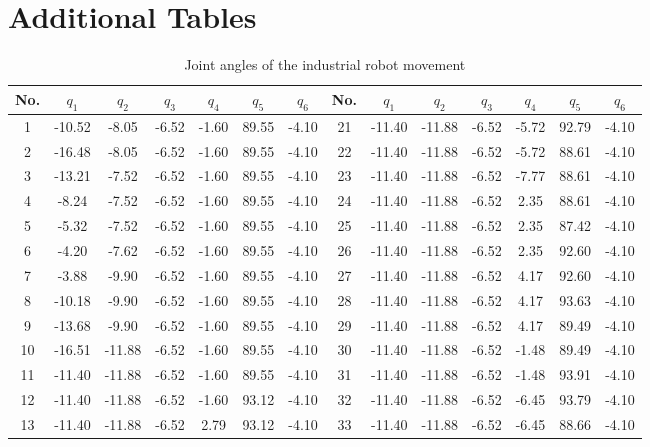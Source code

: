 \documentclass[lettersize,onecolumn]{IEEEtran}
\begin{document}
\section{Additional Tables}
\renewcommand{\thetable}{S.I}
\begin{table}[!htb]
	\caption{Joint angles of the industrial robot movement}
	\label{tab1}
	\centering
	\footnotesize
	\begin{tabular}{c cccccc|c cccccc}
		\toprule
		No. & \(q_1\) & \(q_2\) & \(q_3\) & \(q_4\) & \(q_5\) & \(q_6\) & No. & \(q_1\) & \(q_2\) & \(q_3\) & \(q_4\) & \(q_5\) & \(q_6\) \\
		\midrule
		1  & -10.52 & -8.05 & -6.52 & -1.60 & 89.55 & -4.10 & 21 & -11.40 & -11.88 & -6.52 & -5.72 & 92.79 & -4.10 \\
		2  & -16.48 & -8.05 & -6.52 & -1.60 & 89.55 & -4.10 & 22 & -11.40 & -11.88 & -6.52 & -5.72 & 88.61 & -4.10 \\
		3  & -13.21 & -7.52 & -6.52 & -1.60 & 89.55 & -4.10 & 23 & -11.40 & -11.88 & -6.52 & -7.77 & 88.61 & -4.10 \\
		4  & -8.24  & -7.52 & -6.52 & -1.60 & 89.55 & -4.10 & 24 & -11.40 & -11.88 & -6.52 & 2.35  & 88.61 & -4.10 \\
		5  & -5.32  & -7.52 & -6.52 & -1.60 & 89.55 & -4.10 & 25 & -11.40 & -11.88 & -6.52 & 2.35  & 87.42 & -4.10 \\
		6  & -4.20  & -7.62 & -6.52 & -1.60 & 89.55 & -4.10 & 26 & -11.40 & -11.88 & -6.52 & 2.35  & 92.60 & -4.10 \\
		7  & -3.88  & -9.90 & -6.52 & -1.60 & 89.55 & -4.10 & 27 & -11.40 & -11.88 & -6.52 & 4.17  & 92.60 & -4.10 \\
		8  & -10.18 & -9.90 & -6.52 & -1.60 & 89.55 & -4.10 & 28 & -11.40 & -11.88 & -6.52 & 4.17  & 93.63 & -4.10 \\
		9  & -13.68 & -9.90 & -6.52 & -1.60 & 89.55 & -4.10 & 29 & -11.40 & -11.88 & -6.52 & 4.17  & 89.49 & -4.10 \\
		10 & -16.51 & -11.88 & -6.52 & -1.60 & 89.55 & -4.10 & 30 & -11.40 & -11.88 & -6.52 & -1.48 & 89.49 & -4.10 \\
		11 & -11.40 & -11.88 & -6.52 & -1.60 & 89.55 & -4.10 & 31 & -11.40 & -11.88 & -6.52 & -1.48 & 93.91 & -4.10 \\
		12 & -11.40 & -11.88 & -6.52 & -1.60 & 93.12 & -4.10 & 32 & -11.40 & -11.88 & -6.52 & -6.45 & 93.79 & -4.10 \\
		13 & -11.40 & -11.88 & -6.52 & 2.79  & 93.12 & -4.10 & 33 & -11.40 & -11.88 & -6.52 & -6.45 & 88.66 & -4.10 \\

\end{tabular}
\end{table}
\end{document}
